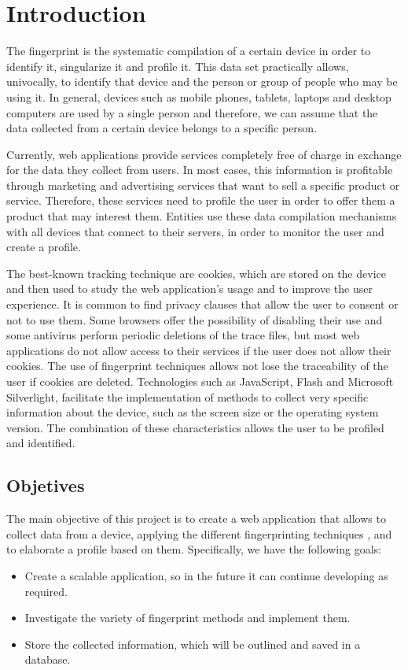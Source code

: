 \chapter{Introduction}

The fingerprint is the systematic compilation of a certain device in order to identify it, singularize it and profile it. This data set practically allows, univocally, to identify that device and the person or group of people who may be using it. In general, devices such as mobile phones, tablets, laptops and desktop computers are used by a single person and therefore, we can assume that the data collected from a certain device belongs to a specific person. \par

Currently, web applications provide services completely free of charge in exchange for the data they collect from users. In most cases, this information is profitable through marketing and advertising services that want to sell a specific product or service. Therefore, these services need to profile the user in order to offer them a product that may interest them. Entities use these data compilation mechanisms with all devices that connect to their servers, in order to monitor the user and create a profile. \par

The best-known tracking technique are cookies, which are stored on the device and then used to study the web application's usage and to improve the user experience. It is common to find privacy clauses that allow the user to consent or not to use them. Some browsers offer the possibility of disabling their use and some antivirus perform periodic deletions of the trace files, but most web applications do not allow access to their services if the user does not allow their cookies. The use of fingerprint techniques allows not lose the traceability of the user if cookies are deleted. Technologies such as JavaScript, Flash and Microsoft Silverlight, facilitate the implementation of methods to collect very specific information about the device, such as the screen size or the operating system version. The combination of these characteristics allows the user to be profiled and identified. \par

\section{Objetives}
 

The main objective of this project is to create a web application that allows to collect data from a device, applying the different fingerprinting techniques , and to elaborate a profile based on them. Specifically, we have the following goals:
\begin{itemize}
    \item Create a scalable application, so in the future it can continue developing as required.
    \item Investigate the variety of fingerprint methods and implement them.
    \item Store the collected information, which will be outlined and saved in a database.
\end{itemize}

